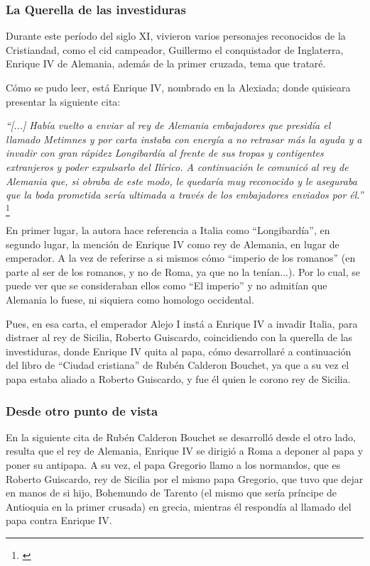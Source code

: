 

\subsubsection{La Querella de las investiduras}

Durante este período del siglo XI, vivieron varios personajes
reconocidos de la Cristiandad, como el cid campeador, Guillermo
el conquistador de Inglaterra, Enrique IV de Alemania, además
de la primer cruzada, tema que trataré.

Cómo se pudo leer, está Enrique IV, nombrado en la Alexiada;
donde quisieara presentar la siguiente cita:

\textit{``[...] Había vuelto a enviar al rey de Alemania embajadores
que presidía el llamado Metimnes y por carta instaba con energía a no
retrasar más la ayuda y a invadir con gran rápidez Longibardía al frente
de sus tropas y contigentes extranjeros y poder expulsarlo del Ilírico.
A continuación le comunicó al rey de Alemania que, si obraba de este
modo, le quedaría muy reconocido y le aseguraba que la boda prometida
sería ultimada a través de los embajadores enviados por él.''}
\footnote{\cite[p.~215]{alexiadaV}}

En primer lugar, la autora hace referencia a Italia como ``Longibardía'',
en segundo lugar, la mención de Enrique IV como rey de Alemania, en
lugar de emperador. A la vez de referirse a si mismos cómo
``imperio de los romanos'' (en parte al ser de los romanos, y no
de Roma, ya que no la tenían...). Por lo cual, se puede ver
que se consideraban ellos como ``El imperio'' y no admitían que
Alemania lo fuese, ni siquiera como homologo occidental.

Pues, en esa carta, el emperador Alejo I instá a Enrique IV a invadir
Italia, para distraer al rey de Sicilia, Roberto Guiscardo,
coincidiendo con la querella de las investiduras, donde Enrique IV
quita al papa, cómo desarrollaré a continuación del libro de
``Ciudad cristiana'' de Rubén Calderon Bouchet, ya que a su vez
el papa estaba aliado a Roberto Guiscardo, y fue él quien le corono
rey de Sicilia.

\subsubsection{Desde otro punto de vista}

En la siguiente cita de Rubén Calderon Bouchet se desarrolló
desde el otro lado, resulta que el rey de Alemania, Enrique IV
se dirigió a Roma a deponer al papa y poner su antipapa.
A su vez, el papa Gregorio llamo a los normandos, que es
Roberto Guiscardo, rey de Sicilia por el mismo papa Gregorio,
que tuvo que dejar en manos de si hijo, Bohemundo de Tarento
(el mismo que sería príncipe de Antioquia en la primer crusada)
en grecia, mientras él respondía al llamado del papa
contra Enrique IV.

